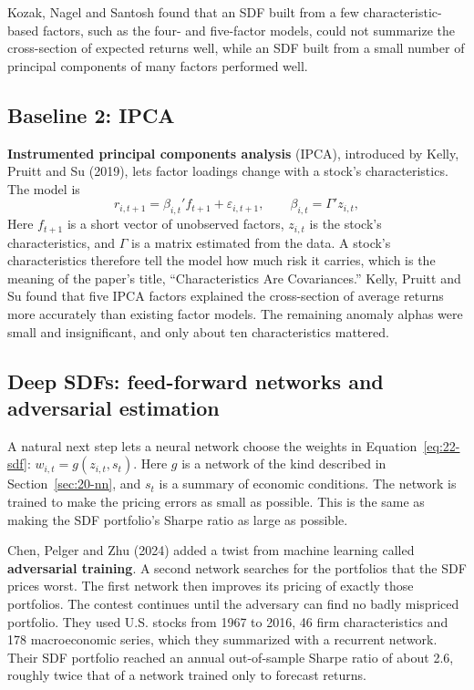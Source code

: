 Kozak, Nagel and Santosh found that an SDF built from a few characteristic-based factors, such as the four- and five-factor models, could not summarize the cross-section of expected returns well, while an SDF built from a small number of principal components of many factors performed well.

\subsection{Baseline 2: IPCA}

\textbf{Instrumented principal components analysis} (IPCA), introduced by Kelly, Pruitt and Su (2019), lets factor loadings change with a stock's characteristics. The model is
\begin{equation}
  r_{i,t+1} = \beta_{i,t}' f_{t+1} + \varepsilon_{i,t+1}, \qquad \beta_{i,t} = \Gamma' z_{i,t},
  \label{eq:22-ipca}
\end{equation}
Here $f_{t+1}$ is a short vector of unobserved factors, $z_{i,t}$ is the stock's characteristics, and $\Gamma$ is a matrix estimated from the data. A stock's characteristics therefore tell the model how much risk it carries, which is the meaning of the paper's title, ``Characteristics Are Covariances.'' Kelly, Pruitt and Su found that five IPCA factors explained the cross-section of average returns more accurately than existing factor models. The remaining anomaly alphas were small and insignificant, and only about ten characteristics mattered.

\subsection{Deep SDFs: feed-forward networks and adversarial estimation}

A natural next step lets a neural network choose the weights in Equation~\eqref{eq:22-sdf}: $w_{i,t} = g(z_{i,t}, s_t)$. Here $g$ is a network of the kind described in Section~\ref{sec:20-nn}, and $s_t$ is a summary of economic conditions. The network is trained to make the pricing errors as small as possible. This is the same as making the SDF portfolio's Sharpe ratio as large as possible.

Chen, Pelger and Zhu (2024) added a twist from machine learning called \textbf{adversarial training}. A second network searches for the portfolios that the SDF prices worst. The first network then improves its pricing of exactly those portfolios. The contest continues until the adversary can find no badly mispriced portfolio. They used U.S. stocks from 1967 to 2016, 46 firm characteristics and 178 macroeconomic series, which they summarized with a recurrent network. Their SDF portfolio reached an annual out-of-sample Sharpe ratio of about 2.6, roughly twice that of a network trained only to forecast returns.

